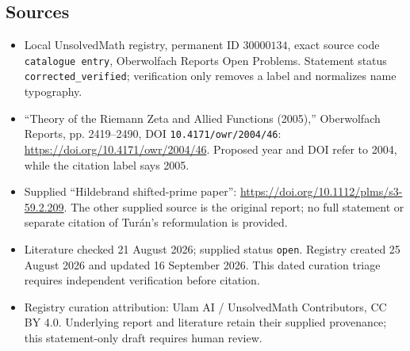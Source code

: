 \documentclass[11pt]{article}
\begin{document}
\subsection{Sources}
\begin{itemize}
\item Local UnsolvedMath registry, permanent ID \(30000134\), exact source code \texttt{catalogue entry}, Oberwolfach Reports Open Problems. Statement status \texttt{corrected\_verified}; verification only removes a label and normalizes name typography.
\item ``Theory of the Riemann Zeta and Allied Functions (2005),'' Oberwolfach Reports, pp. 2419--2490, DOI \texttt{10.4171/owr/2004/46}: \url{https://doi.org/10.4171/owr/2004/46}. Proposed year and DOI refer to 2004, while the citation label says 2005.
\item Supplied ``Hildebrand shifted-prime paper'': \url{https://doi.org/10.1112/plms/s3-59.2.209}. The other supplied source is the original report; no full statement or separate citation of Tur\'an's reformulation is provided.
\item Literature checked 21 August 2026; supplied status \texttt{open}. Registry created 25 August 2026 and updated 16 September 2026. This dated curation triage requires independent verification before citation.
\item Registry curation attribution: Ulam AI / UnsolvedMath Contributors, CC BY 4.0. Underlying report and literature retain their supplied provenance; this statement-only draft requires human review.
\end{itemize}
\end{document}
